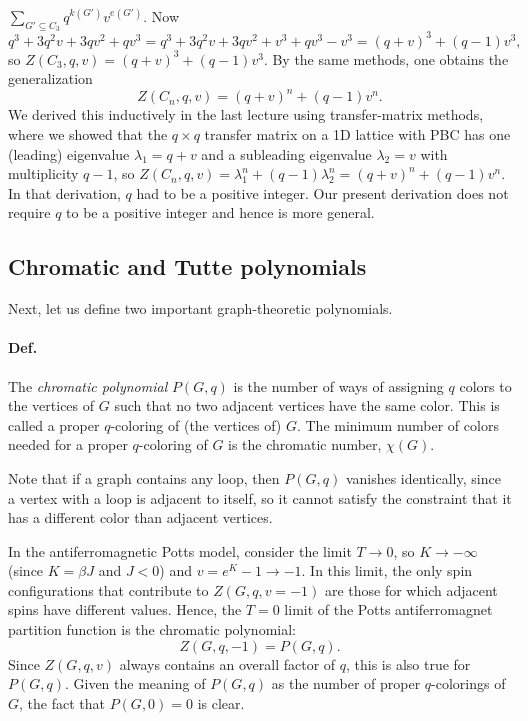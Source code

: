 $\sum_{G'\subseteq C_3}q^{k(G')}v^{e(G')}$. Now
\begin{equation}
  q^3+3q^2v+3qv^2+qv^3 = q^3+3q^2v+3qv^2+v^3+qv^3-v^3 = (q+v)^3+(q-1)v^3,
\end{equation}
so $Z(C_3,q,v) = (q+v)^3+(q-1)v^3$. By the same methods, one obtains the generalization
\begin{equation}
  Z(C_n,q,v) = (q+v)^n+(q-1)v^n .
\end{equation}
We derived this inductively in the last lecture using transfer-matrix methods, where we showed that the $q\times q$ transfer
matrix on a 1D lattice with PBC has one (leading) eigenvalue $\lambda_1 = q+v$ and a subleading eigenvalue $\lambda_2 = v$ with
multiplicity $q-1$, so $Z(C_n,q,v) = \lambda_1^n+(q-1)\lambda_2^n = (q+v)^n+(q-1)v^n$. In that derivation, $q$ had to be a
positive integer. Our present derivation does not require $q$ to be a positive integer and hence is more general.

\subsection{Chromatic and Tutte polynomials}

Next, let us define two important graph-theoretic polynomials.

\paragraph{Def.} The \emph{chromatic polynomial} $P(G,q)$ is the number of ways of assigning $q$ colors to the vertices of $G$
such that no two adjacent vertices have the same color. This is called a proper $q$-coloring of (the vertices of) $G$. The
minimum number of colors needed for a proper $q$-coloring of $G$ is the chromatic number, $\chi(G)$.

Note that if a graph contains any loop, then $P(G,q)$ vanishes identically, since a vertex with a loop is adjacent to itself,
so it cannot satisfy the constraint that it has a different color than adjacent vertices.

In the antiferromagnetic Potts model, consider the limit $T\to 0$, so $K\to-\infty$ (since $K = \beta J$ and $J<0$) and
$v = e^K-1\to-1$. In this limit, the only spin configurations that contribute to $Z(G,q,v=-1)$ are those for which adjacent
spins have different values. Hence, the $T = 0$ limit of the Potts antiferromagnet partition function is the chromatic
polynomial:
\begin{equation}
  Z(G,q,-1) = P(G,q).
\end{equation}
Since $Z(G,q,v)$ always contains an overall factor of $q$, this is also true for $P(G,q)$. Given the meaning of $P(G,q)$ as the
number of proper $q$-colorings of $G$, the fact that $P(G,0) = 0$ is clear.


